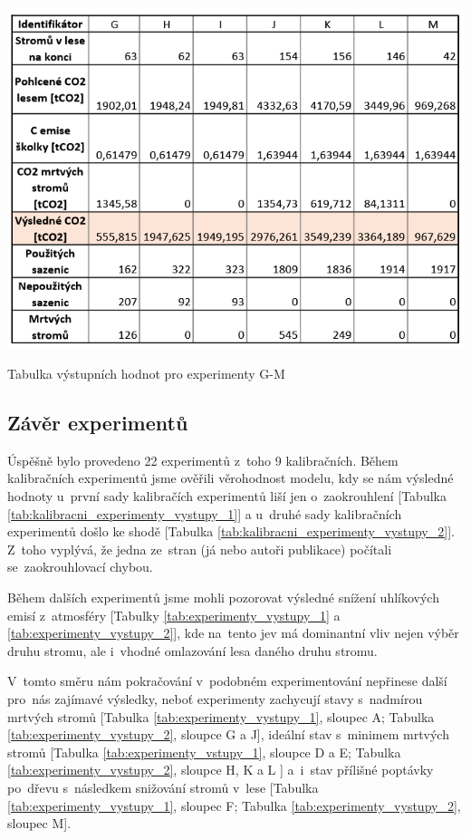 \documentclass[a4paper, 11pt, titlepage]{article}
\begin{document}
\begin{table}[htb!]
    \centering
    \includegraphics[scale=0.8]{assets/tab_e_G_M_out.PNG}
    \caption{Tabulka výstupních hodnot pro experimenty G-M}
    \label{tab:experimenty_vystupy_2}
\end{table}

\newpage
\subsection{Závěr experimentů}

Úspěšně bylo provedeno 22 experimentů z~toho 9 kalibračních. Během kalibračních experimentů jsme ověřili věrohodnost modelu, kdy se nám výsledné hodnoty u~první sady kalibračích experimentů liší jen o~zaokrouhlení [Tabulka \ref{tab:kalibracni_experimenty_vystupy_1}] a u~druhé sady kalibračních experimentů došlo ke shodě [Tabulka \ref{tab:kalibracni_experimenty_vystupy_2}]. Z~toho vyplývá, že jedna ze~stran (já nebo autoři publikace) počítali se~zaokrouhlovací chybou.

Během dalších experimentů jsme mohli pozorovat výsledné snížení uhlíkových emisí z~atmosféry [Tabulky \ref{tab:experimenty_vystupy_1} a \ref{tab:experimenty_vystupy_2}], kde na~tento jev má dominantní vliv nejen výběr druhu stromu, ale i~vhodné omlazování lesa daného druhu stromu. 

V~tomto směru nám pokračování v~podobném experimentování nepřinese další pro~nás zajímavé výsledky, neboť experimenty zachycují stavy s~nadmírou mrtvých stromů [Tabulka \ref{tab:experimenty_vystupy_1}, sloupec A; Tabulka \ref{tab:experimenty_vystupy_2}, sloupce G a J], ideální stav s~minimem mrtvých stromů [Tabulka \ref{tab:experimenty_vstupy_1}, sloupce D a E; Tabulka \ref{tab:experimenty_vystupy_2}, sloupce H, K a L ] a~i~stav přílišné poptávky po~dřevu s~následkem snižování stromů v~lese [Tabulka \ref{tab:experimenty_vystupy_1}, sloupec F; Tabulka \ref{tab:experimenty_vystupy_2}, sloupec M].   
\end{document}
